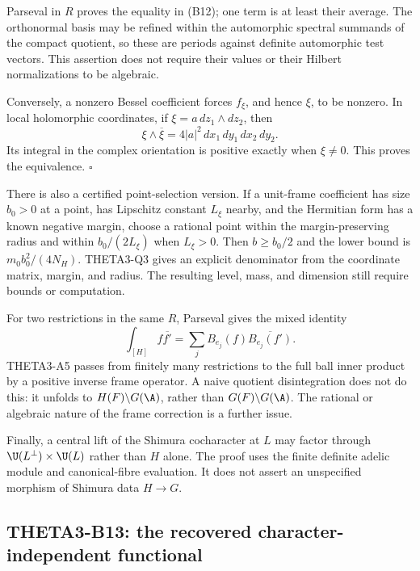 \documentclass[11pt]{article}
\theoremstyle{definition}\newtheorem{definition}[theorem]{Definition}\newtheorem{remark}[theorem]{Remark}
\begin{document}
Parseval in $R$ proves the equality in (B12); one term is at least their average. The orthonormal basis may be refined within the automorphic spectral summands of the compact quotient, so these are periods against definite automorphic test vectors. This assertion does not require their values or their Hilbert normalizations to be algebraic.

Conversely, a nonzero Bessel coefficient forces $f_\xi$, and hence $\xi$, to be nonzero. In local holomorphic coordinates, if $\xi=a\,dz_1\wedge dz_2$, then
\[
 \xi\wedge\overline\xi
   =4|a|^2\,dx_1\,dy_1\,dx_2\,dy_2.
\]
Its integral in the complex orientation is positive exactly when $\xi\ne0$. This proves the equivalence. \hfill$\square$

There is also a certified point-selection version. If a unit-frame coefficient has size $b_0>0$ at a point, has Lipschitz constant $L_\xi$ nearby, and the Hermitian form has a known negative margin, choose a rational point within the margin-preserving radius and within $b_0/(2L_\xi)$ when $L_\xi>0$. Then $b\geq b_0/2$ and the lower bound is $m_0b_0^2/(4N_H)$. THETA3-Q3 gives an explicit denominator from the coordinate matrix, margin, and radius. The resulting level, mass, and dimension still require bounds or computation.

For two restrictions in the same $R$, Parseval gives the mixed identity
\[
 \int_{[H]}f\overline{f'}=
 \sum_j B_{e_j}(f)\overline{B_{e_j}(f')}.
\]
THETA3-A5 passes from finitely many restrictions to the full ball inner product by a positive inverse frame operator. A naive quotient disintegration does not do this: it unfolds to $H(F)\backslash G(\A)$, rather than $G(F)\backslash G(\A)$. The rational or algebraic nature of the frame correction is a further issue.

Finally, a central lift of the Shimura cocharacter at $L$ may factor through $\U(L^\perp)\times\U(L)$ rather than $H$ alone. The proof uses the finite definite adelic module and canonical-fibre evaluation. It does not assert an unspecified morphism of Shimura data $H\to G$.

\subsection{THETA3-B13: the recovered character-independent functional}\label{B13}
\end{document}
